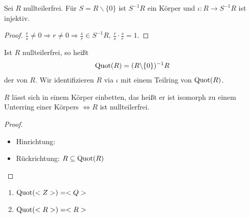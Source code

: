 \begin{conclusion}
	Sei $R$ nullteilerfrei. Für $S = R \backslash \{0\}$ ist $S^{-1}R$ ein Körper und $\iota: R \to S^{-1}R$ ist injektiv.
\end{conclusion}

\begin{proof}
	$\frac{r}{s} \neq 0 \Rightarrow r \neq 0 \Rightarrow \frac{s}{r} \in S^{-1}R$, $\frac{r}{s}\cdot \frac{s}{r} = 1.$
\end{proof}

\begin{definition}
	Ist $R$ nullteilerfrei, so heißt
	\begin{align}
		\operatorname{Quot}(R) = (R\backslash \{0\})^{-1}R\notag
	\end{align}
	der  von $R$. Wir identifizieren $R$ via $\iota$ mit einem Teilring von $\operatorname{Quot}(R)$.
\end{definition}

\begin{conclusion}
	$R$ lässt sich in einem Körper einbetten, das heißt er ist isomorph zu einem Unterring einer Körpers $\Leftrightarrow R$ ist nullteilerfrei.
\end{conclusion}

\begin{proof}
	\begin{itemize}
	\item Hinrichtung: 
	\item Rückrichtung: $R \subseteq \operatorname{Quot}(R)$
	\end{itemize}
\end{proof}

\begin{example}
	\begin{enumerate}
	\item $\operatorname{Quot}(<Z>) = <Q>$
	\item $\operatorname{Quot}(<R>) = <R>$
	\end{enumerate}
\end{example}